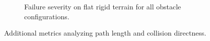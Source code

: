 \begin{figure}
\begin{subfigure}{0.45\textwidth}
        \caption{Failure severity on flat rigid terrain for all obstacle configurations.}
        \label{fig:rigid_failure_metric_histogram}
    \end{subfigure}
    \caption{Additional metrics analyzing path length and collision directness.}
\end{figure}
